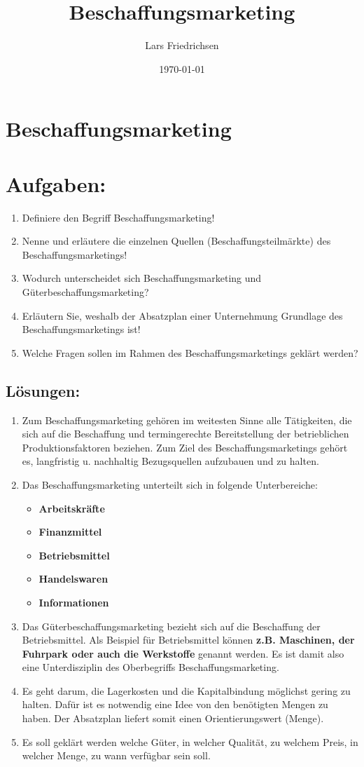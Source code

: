 \documentclass[a4paper,11pt]{scrartcl}	%
\title{Beschaffungsmarketing}
\author{Lars Friedrichsen}
\date{\today}
\begin{document}
\section{Beschaffungsmarketing}


\section{Aufgaben:}

	\begin{enumerate}
		\item Definiere den Begriff Beschaffungsmarketing!
		\item Nenne und erläutere die einzelnen Quellen (Beschaffungsteilmärkte) des Beschaffungsmarketings!
		\item Wodurch unterscheidet sich Beschaffungsmarketing und Güterbeschaffungsmarketing?
		\item Erläutern Sie, weshalb der Absatzplan einer Unternehmung Grundlage des Beschaffungsmarketings ist!
		\item Welche Fragen sollen im Rahmen des Beschaffungsmarketings geklärt werden?
	\end{enumerate}
	
	\subsection{Lösungen:}
	
		\begin{enumerate}
			\item Zum Beschaffungsmarketing gehören im weitesten Sinne alle Tätigkeiten, die sich auf die Beschaffung
			und termingerechte Bereitstellung der betrieblichen Produktionsfaktoren beziehen.
			Zum Ziel des Beschaffungsmarketings gehört es, langfristig u. nachhaltig Bezugsquellen aufzubauen und zu halten.
			\item Das Beschaffungsmarketing unterteilt sich in folgende Unterbereiche:
				\begin{itemize}
					\item \textbf{Arbeitskräfte}
					\item \textbf{Finanzmittel} 
					\item \textbf{Betriebsmittel} 
					\item \textbf{Handelswaren}
					\item \textbf{Informationen}
				\end{itemize}				 
			\item Das Güterbeschaffungsmarketing bezieht sich auf die Beschaffung der Betriebsmittel. 
				Als Beispiel für Betriebsmittel können \textbf{z.B. Maschinen, der Fuhrpark oder auch die Werkstoffe}
			genannt werden. Es ist damit also eine Unterdisziplin des Oberbegriffs Beschaffungsmarketing.			
			\item Es geht darum, die Lagerkosten und die Kapitalbindung möglichst gering zu halten.  
			Dafür ist es notwendig eine Idee von den benötigten Mengen zu haben.
			Der Absatzplan liefert somit einen Orientierungswert (Menge).
			\item Es soll geklärt werden welche Güter, in welcher Qualität, zu welchem Preis, in welcher Menge,
			zu wann verfügbar sein soll.
		\end{enumerate}
	
	
\end{document}
